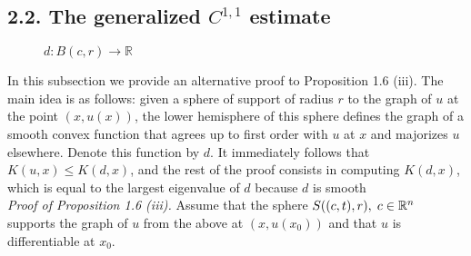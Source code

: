 \documentclass[10pt]{article}
\newcommand{\cercle}[4]{
\node[circle,inner sep=0,minimum size={2*#2}](a) at (#1) {};
\draw[blue,thick] (a.#3) arc (#3:{#3+#4}:#2);
}
\begin{document}
\subsection{2.2. The generalized $C^{1,1}$ estimate}
\begin{figure}[H]
\centering
{}

\caption{$d:B(c,r)\rightarrow \mathbb{R}$}
\end{figure}
In this subsection we provide an alternative proof to Proposition 1.6 (iii). The main idea is as follows: given a sphere of support of radius $r$ to the graph of $u$ at the point $(x,u(x))$, the lower hemisphere of this sphere defines the graph of a smooth convex function that agrees up to first order with $u$ at $x$ and majorizes $u$ elsewhere. Denote this function by $d$. It immediately follows that $K(u,x)\leq K(d,x)$, and the rest of the proof consists in computing $K(d,x)$, which is equal to the largest eigenvalue of $d$ because $d$ is smooth \\
\textit{Proof of Proposition 1.6 (iii).} Assume that the sphere $S((c,t),r), \hspace{1mm} c\in \mathbb{R}^{n}$ supports the graph of $u$ from the above at $(x,u(x_0))$ and that $u$ is differentiable at $x_0$.
\end{document}

